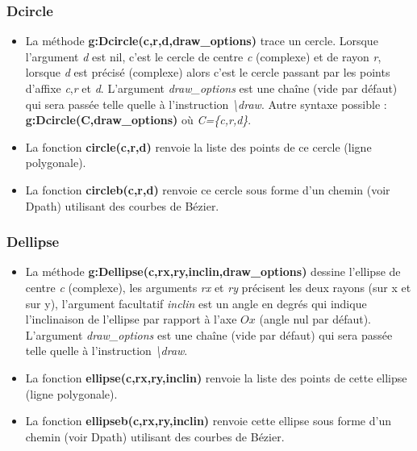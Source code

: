 \subsubsection{Dcircle}
\begin{itemize}
    \item La méthode \textbf{g:Dcircle(c,r,d,draw\_options)} trace un cercle. Lorsque l'argument \emph{d} est nil, c'est le cercle de centre \emph{c} (complexe) et de rayon \emph{r}, lorsque \emph{d} est précisé (complexe) alors c'est le cercle passant par les points d'affixe \emph{c},\emph{r} et \emph{d}. L'argument \emph{draw\_options} est une chaîne (vide par défaut) qui sera passée telle quelle à l'instruction \emph{\textbackslash draw}. Autre syntaxe possible :  \textbf{g:Dcircle(C,draw\_options)} où \emph{C=\{c,r,d\}}.
  \item La fonction \textbf{circle(c,r,d)} renvoie la liste des points de ce cercle (ligne polygonale). 
  \item La fonction \textbf{circleb(c,r,d)} renvoie ce cercle sous forme d'un chemin (voir Dpath) utilisant des courbes de Bézier.
\end{itemize}

\subsubsection{Dellipse}
\begin{itemize}
    \item  La méthode \textbf{g:Dellipse(c,rx,ry,inclin,draw\_options)} dessine l'ellipse de centre \emph{c} (complexe), les arguments \emph{rx} et \emph{ry} précisent les deux rayons (sur x et sur y), l'argument facultatif \emph{inclin} est un angle en degrés qui indique l'inclinaison de l'ellipse par rapport à l'axe \(Ox\) (angle nul par défaut). L'argument \emph{draw\_options} est une chaîne (vide par défaut) qui sera passée telle quelle à l'instruction \emph{\textbackslash draw}.
  \item La fonction \textbf{ellipse(c,rx,ry,inclin)} renvoie la liste des points de cette ellipse (ligne polygonale). 
  \item La fonction \textbf{ellipseb(c,rx,ry,inclin)} renvoie cette ellipse sous forme d'un chemin (voir Dpath) utilisant des courbes de Bézier.
\end{itemize}

